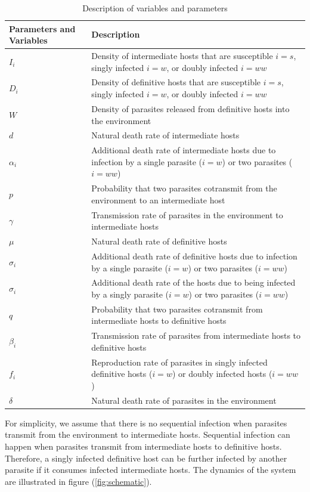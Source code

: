 \documentclass{article}
\begin{document}
\begin{table}[!ht]
\begin{tabular}{|p{2.5cm}|p{12cm}|} 
\hline
Parameters and Variables    &  Description  \\
\hline
$I_i$  & Density of intermediate hosts that are susceptible $i=s$, singly infected $i=w$, or doubly infected $i=ww$ \\
\hline
$D_i$ & Density of definitive hosts that are susceptible $i=s$, singly infected $i=w$, or doubly infected $i=ww$ \\
\hline
$W$ & Density of parasites released from definitive hosts into the environment \\
\hline
$d$ & Natural death rate of intermediate hosts \\
\hline
$\alpha_i$ & Additional death rate of intermediate hosts due to infection by a single parasite ($i = w$) or two parasites ($i = ww$) \\
\hline
$p$ & Probability that two parasites cotransmit from the environment to an intermediate host \\
\hline
$\gamma$ & Transmission rate of parasites in the environment to intermediate hosts \\
\hline
$\mu$ & Natural death rate of definitive hosts \\
\hline
$\sigma_i$ & Additional death rate of definitive hosts due to infection by a single parasite ($i = w$) or two parasites ($i = ww$) \\
\hline
$\sigma_i$ & Additional death rate of the hosts due to being infected by a singly parasite ($i = w$) or two parasites ($i = ww$) \\
\hline
$q$ & Probability that two parasites cotransmit from intermediate hosts to definitive hosts \\
\hline
$\beta_i$ & Transmission rate of parasites from intermediate hosts to definitive hosts \\
\hline
$f_i$ & Reproduction rate of parasites in singly infected definitive hosts ($i = w$) or doubly infected hosts ($i = ww$)\\
\hline
$\delta$ & Natural death rate of parasites in the environment \\
\hline
\end{tabular}
\caption{Description of variables and parameters}
\label{table:varpardescription}
\end{table}

For simplicity, we assume that there is no sequential infection when parasites transmit from the environment to intermediate hosts. 
Sequential infection can happen when parasites transmit from intermediate hosts to definitive hosts. 
Therefore, a singly infected definitive host can be further infected by another parasite if it consumes infected intermediate hosts. The dynamics of the system are illustrated in figure (\ref{fig:schematic}).
\end{document}
